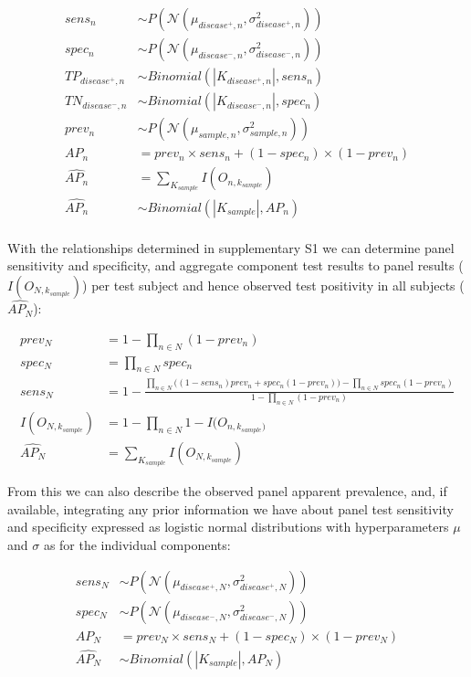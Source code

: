 \documentclass[a4paper, 12pt, twoside]{article}
\begin{document}
\begin{equation*}
\begin{aligned}
sens_n &\sim P(\mathcal{N}(\mu_{disease^+,n}, \sigma_{disease^+,n}^2)) \\
spec_n &\sim P(\mathcal{N}(\mu_{disease^-,n}, \sigma_{disease^-,n}^2)) \\
TP_{disease^+,n} &\sim Binomial(|K_{disease^+,n}|, sens_n) \\
TN_{disease^-,n} &\sim Binomial(|K_{disease^-,n}|, spec_n) \\
prev_n &\sim P(\mathcal{N}(\mu_{sample,n}, \sigma_{sample,n}^2)) \\
AP_n &= prev_n \times sens_n + (1-spec_n) \times (1-prev_n) \\
\widehat{AP_n} &= \sum_{K_{sample}}{I(O_{n,k_{sample}})} \\
\widehat{AP_n} &\sim Binomial(|K_{sample}|, AP_n) \\
\end{aligned}
\end{equation*}

With the relationships determined in supplementary S1 we can determine panel sensitivity and specificity, and aggregate component test results to panel results (\(I(O_{N,k_{sample}})\)) per test subject and hence observed test positivity in all subjects (\(\widehat{AP_N}\)):

\begin{equation*}
\begin{aligned}
prev_N &= 1-\prod_{n \in N}(1-prev_n) \\
spec_N &= \prod_{n \in N}{spec_n} \\
sens_N &= 1-\frac{
  \prod_{n \in N}{\bigg((1-sens_n) prev_n + spec_n  (1-prev_n) \bigg) } - \prod_{n \in N}{spec_n (1-prev_n)}
}{
  1 - \prod_{n \in N}{ (1-prev_n)} %
} \\
I(O_{N,k_{sample}}) &= 1-\prod_{n \in N}{1-I(O_{n,k_{sample})}} \\
\widehat{AP_N} &= \sum_{K_{sample}}{I(O_{N,k_{sample}})}
\end{aligned}
\end{equation*}

From this we can also describe the observed panel apparent prevalence, and, if available, integrating any prior information we have about panel test sensitivity and specificity expressed as logistic normal distributions with hyperparameters \(\mu\) and \(\sigma\) as for the individual components:

\begin{equation*}
\begin{aligned}
sens_N &\sim P(\mathcal{N}(\mu_{disease^+,N}, \sigma_{disease^+,N}^2)) \\
spec_N &\sim P(\mathcal{N}(\mu_{disease^-,N}, \sigma_{disease^-,N}^2)) \\
AP_N &= prev_N \times sens_N + (1-spec_N) \times (1-prev_N) \\
\widehat{AP_N} &\sim Binomial(|K_{sample}|, AP_N) \\
\end{aligned}
\end{equation*}
\end{document}
